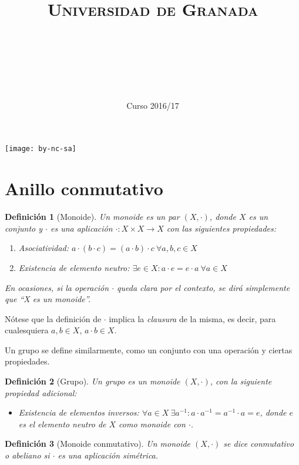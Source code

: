 \documentclass[11pt, a4paper, titlepage]{article}
\title{
  \normalfont \normalsize 
  \textsc{Universidad de Granada} \\ [25pt]    %
  \horrule{0.5pt} \\[0.4cm] %
  \huge \subject\\ %
  \horrule{2pt} \\[0.5cm] %
}
\author{\Large{\docauthor}}
\date{\vspace{-1.5em} \normalsize Curso 2016/17}
\theoremstyle{theorem-style}
\theoremstyle{definition-style}
\newtheorem*{ndef}{Definición}
\theoremstyle{remark-style}
\theoremstyle{example-style}
\newenvironment{nlist}
{\begin{enumerate}
\renewcommand\labelenumi{(\emph{\roman{enumi})}}}
{\end{enumerate}}
\begin{document}
\maketitle
\tableofcontents
\vfill
\begin{center}
\texttt{[image: by-nc-sa]}  %
\end{center}
\newpage

\section{Anillo conmutativo}

\begin{ndef}[Monoide]
  Un monoide es un par $(X, \cdot)$, donde $X$ es un conjunto y $\cdot$ es una aplicación $\cdot: X\times X\to X$ con las siguientes propiedades:
  \begin{nlist}
  \item Asociatividad: $a\cdot (b \cdot c) = (a \cdot b) \cdot c \ \forall a,b,c \in X$
  \item Existencia de elemento neutro: $\exists e \in X : a \cdot e = e \cdot a \ \forall a \in X$
  \end{nlist}

  En ocasiones, si la operación $\cdot$ queda clara por el contexto, se dirá simplemente que ``X es un monoide''.
\end{ndef}

Nótese que la definición de $\cdot$ implica la \emph{clausura} de la misma, es decir, para cualesquiera $a,b \in X$, $a\cdot b \in X$.

Un grupo se define similarmente, como un conjunto con una operación y ciertas propiedades.

\begin{ndef}[Grupo]
  Un grupo es un monoide $(X, \cdot)$, con la siguiente propiedad adicional:

  \begin{itemize}
  \item Existencia de elementos inversos: $\forall a\in X \ \exists a^{-1} : a\cdot a^{-1} = a^{-1}\cdot a = e$, donde $e$ es el elemento neutro de $X$ como monoide con $\cdot$.
  \end{itemize}
  
\end{ndef}

\begin{ndef}[Monoide conmutativo]
  Un monoide $(X, \cdot)$ se dice \emph{conmutativo} o \emph{abeliano} si $\cdot$ es una aplicación simétrica.
\end{ndef}
\end{document}
